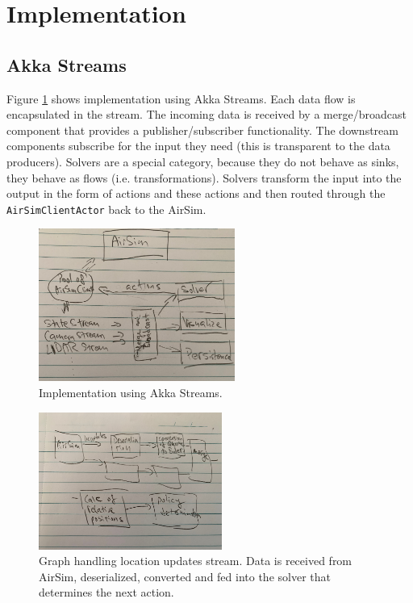 \documentclass{article}
\begin{document}
\section{Implementation}




\subsection{Akka Streams}
Figure \ref{fig:with-flow} shows implementation using Akka Streams. Each data flow is encapsulated in the stream. The incoming data is received by a merge/broadcast component that provides a publisher/subscriber functionality. The downstream components subscribe for the input they need (this is transparent to the data producers). Solvers are a special category, because they do not behave as sinks, they behave as flows (i.e. transformations). Solvers transform the input into the output in the form of actions and these actions and then routed through the \verb|AirSimClientActor| back to the AirSim.

\begin{figure}
	\centering
	\includegraphics[height=5cm]{with-flow}
	\caption{Implementation using Akka Streams.}\label{fig:with-flow}
\end{figure}

\begin{figure}
	\centering
	\includegraphics[width=6cm]{flow-in-sketch}
	\caption{Graph handling location updates stream. Data is received from AirSim, deserialized, converted and fed into the solver that determines the next action.}\label{fig:flow-in}
\end{figure}
\end{document}
